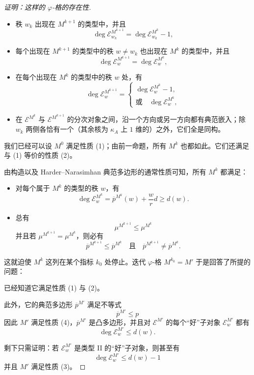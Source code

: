 \begin{proof}[证明：这样的 $\varphi$-格的存在性]
\begin{itemize}
\item 秩 $w_k$ 出现在 $M^{k+1}$ 的类型中，并且
\[
\deg \mathcal{E}^{M^{k+1}}_{w_k} = \deg \mathcal{E}^{M^k}_{w_k} - 1,
\]

\item 每个出现在 $M^{k+1}$ 的类型中的秩 $w \neq w_k$ 也出现在 $M^k$ 的类型中，并且
\[
\deg \mathcal{E}^{M^{k+1}}_w = \deg \mathcal{E}^{M^k}_w,
\]

\item 在每个出现在 $M^k$ 的类型中的秩 $w$ 处，有
\[
\deg \mathcal{E}^{M^{k+1}}_w =
\begin{cases}
\deg \mathcal{E}^{M^k}_w - 1, \\
\text{或} \quad \deg \mathcal{E}^{M^k}_w,
\end{cases}
\]

\item 在 $\mathcal{E}^{M^k}$ 与 $\mathcal{E}^{M^{k+1}}$ 的分次对象之间，沿一个方向或另一方向都有典范嵌入；除 $w_k$ 两侧各恰有一个（其余核为 $\kappa_A$ 上 $1$ 维的）之外，它们全是同构。
\end{itemize}

我们已经可以设 $M^0$ 满足性质 (1)；由前一命题，所有 $M^k$ 也都如此。它们还满足与 (1) 等价的性质 (2)。

由构造以及 Harder–Narasimhan 典范多边形的通常性质可知，所有 $M^k$ 都满足：

\begin{itemize}
\item 对每个属于 $M^k$ 的类型的秩 $w$，有
\[
\deg \mathcal{E}^{M^k}_w = \overline{p}^{M^k}(w) + \frac{w}{r}d \ge d(w).
\]

\item 总有
\[
\mu^{M^{k+1}} \le \mu^{M^k}
\]
并且若 $\mu^{M^{k+1}} = \mu^{M^k}$，则必有
\[
\overline{p}^{M^{k+1}} \le \overline{p}^{M^k} \quad \text{且} \quad \overline{p}^{M^{k+1}} \neq \overline{p}^{M^k}.
\]
\end{itemize}

这就迫使 $M^k$ 这列在某个指标 $k_0$ 处停止。迭代 $\varphi$-格 $M^{k_0} = M'$ 于是回答了所提的问题：

已经知道它满足性质 (1) 与 (2)。

此外，它的典范多边形 $\overline{p}^{M'}$ 满足不等式
\[
\overline{p}^{M'} \le p
\]
因此 $M'$ 满足性质 (4)，$\overline{p}^{M'}$ 是凸多边形，并且对 $\mathcal{E}^{M'}$ 的每个“好”子对象 $\mathcal{E}^{M'}_w$ 都有
\[
\deg \mathcal{E}^{M'}_w \le d(w).
\]

剩下只需证明：若 $\mathcal{E}^{M'}_w$ 是类型 II 的“好”子对象，则甚至有
\[
\deg \mathcal{E}^{M'}_w \le d(w) - 1
\]
并且 $M'$ 满足性质 (3)。


\end{proof}

